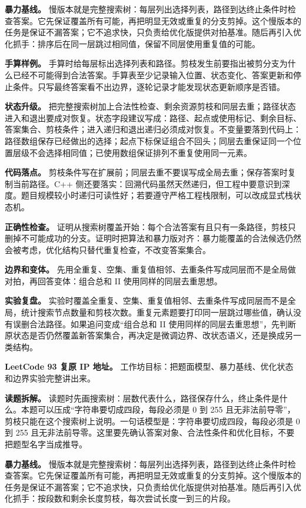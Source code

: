 \textbf{暴力基线。} 慢版本就是完整搜索树：每层列出选择列表，路径到达终止条件时检查答案。它先保证覆盖所有可能，再把明显无效或重复的分支剪掉。这个慢版本的任务是保证不漏答案；它不追求快，只负责给优化版提供对拍基准。随后再引入优化抓手：排序后在同一层跳过相同值，保留不同层使用重复值的可能。

\textbf{手算样例。} 手算时给每层标出选择列表和路径。剪枝发生前要指出被剪分支为什么已经不可能得到合法答案。手算表至少记录输入位置、状态变化、答案更新和停止条件。只写最终答案看不出边界，逐轮记录才能发现状态更新顺序是否错。

\textbf{状态升级。} 把完整搜索树加上合法性检查、剩余资源剪枝和同层去重；路径状态进入和退出要成对恢复。状态字段建议写成：路径、起点或使用标记、剩余目标、答案集合、剪枝条件；进入递归和退出递归必须成对恢复。不变量要落到代码上：路径数组保存已经做出的选择；起点下标保证组合不回头；同层去重保证同一个位置层级不会选择相同值；已使用数组保证排列不重复使用同一元素。

\textbf{代码落点。} 剪枝条件写在扩展前；同层去重不要误写成全局去重；保存答案时复制当前路径。C++ 侧还要落实：回溯代码虽然天然递归，但工程中要意识到深度。题目规模较小时递归可读性好；若要遵守严格工程栈限制，可以改成显式栈状态机。

\textbf{正确性检查。} 证明从搜索树覆盖开始：每个合法答案有且只有一条路径，剪枝只删掉不可能成功的分支。证明时把算法和暴力版对齐：暴力能覆盖的合法候选仍然会被考虑，优化结构只替代重复检查，不改变答案集合。

\textbf{边界和变体。} 先用全重复、空集、重复值相邻、去重条件写成同层而不是全局做对拍，再回答变体：组合总和 II 使用同样的同层去重思想。

\textbf{实验复盘。} 实验时覆盖全重复、空集、重复值相邻、去重条件写成同层而不是全局，统计搜索节点数量和剪枝次数。重复元素题要打印同一层跳过哪些值，确认没有误删合法路径。如果追问变成“组合总和 II 使用同样的同层去重思想”，先判断原状态是否仍然覆盖新答案集合，再决定是微调边界、改状态语义，还是换成另一类结构。

\noindent\textbf{LeetCode 93 复原 IP 地址。} 工作坊目标：把题面模型、暴力基线、优化状态和边界实验完整讲出来。

\textbf{读题拆解。} 读题时先画搜索树：层数代表什么，路径保存什么，终止条件是什么。本题可以压成“字符串要切成四段，每段必须是 0 到 255 且无非法前导零”，剪枝只能在这个搜索树上说明。一句话模型是：字符串要切成四段，每段必须是 0 到 255 且无非法前导零。这里要先确认答案对象、合法性条件和优化目标，不要把题型名字当成推导。

\textbf{暴力基线。} 慢版本就是完整搜索树：每层列出选择列表，路径到达终止条件时检查答案。它先保证覆盖所有可能，再把明显无效或重复的分支剪掉。这个慢版本的任务是保证不漏答案；它不追求快，只负责给优化版提供对拍基准。随后再引入优化抓手：按段数和剩余长度剪枝，每次尝试长度一到三的片段。

